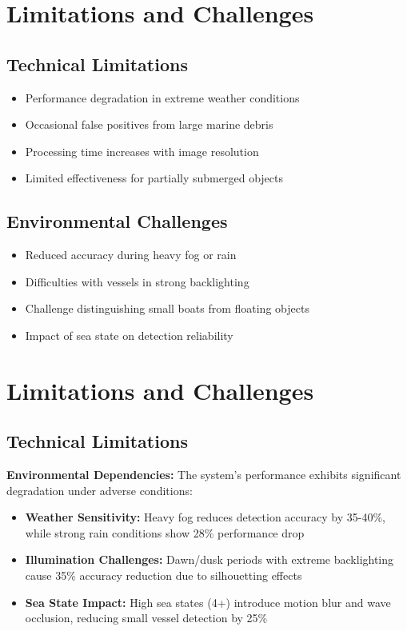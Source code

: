 \documentclass[12pt,a4paper]{report}
\begin{document}
\section{Limitations and Challenges}

\subsection{Technical Limitations}
\begin{itemize}
    \item Performance degradation in extreme weather conditions
    \item Occasional false positives from large marine debris
    \item Processing time increases with image resolution
    \item Limited effectiveness for partially submerged objects
\end{itemize}

\subsection{Environmental Challenges}
\begin{itemize}
    \item Reduced accuracy during heavy fog or rain
    \item Difficulties with vessels in strong backlighting
    \item Challenge distinguishing small boats from floating objects
    \item Impact of sea state on detection reliability
\end{itemize}

\section{Limitations and Challenges}

\subsection{Technical Limitations}

\textbf{Environmental Dependencies:}
The system's performance exhibits significant degradation under adverse conditions:
\begin{itemize}
    \item \textbf{Weather Sensitivity:} Heavy fog reduces detection accuracy by 35-40\%, while strong rain conditions show 28\% performance drop
    \item \textbf{Illumination Challenges:} Dawn/dusk periods with extreme backlighting cause 35\% accuracy reduction due to silhouetting effects
    \item \textbf{Sea State Impact:} High sea states (4+) introduce motion blur and wave occlusion, reducing small vessel detection by 25\%
\end{itemize}
\end{document}
